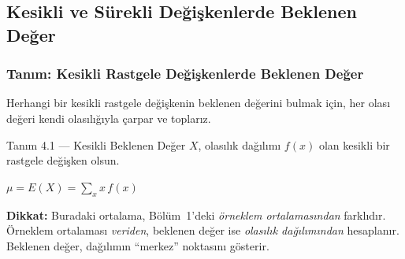 ﻿\documentclass[light]{lutbeamer}
\begin{document}
\subsection{Kesikli ve Sürekli Değişkenlerde Beklenen Değer}

\begin{frame}[fragile]
  \frametitle{Tanım: Kesikli Rastgele Değişkenlerde Beklenen Değer}
  Herhangi bir kesikli rastgele değişkenin beklenen değerini bulmak için, her olası değeri kendi olasılığıyla çarpar ve toplarız.
  \begin{center}
    \begin{minipage}{0.9\textwidth}
      \begin{block}{Tanım 4.1 --- Kesikli Beklenen Değer}
        $X$, olasılık dağılımı $f(x)$ olan kesikli bir rastgele değişken olsun.
        \begin{center}
          $\mu = E(X) = \displaystyle\sum_{x} x\, f(x)$
        \end{center}
      \end{block}
    \end{minipage}
  \end{center}

  \medskip
  {\small \textbf{Dikkat:} Buradaki ortalama, Bölüm~1'deki \emph{örneklem ortalamasından} farklıdır. Örneklem ortalaması \textit{veriden}, beklenen değer ise \textit{olasılık dağılımından} hesaplanır. Beklenen değer, dağılımın ``merkez'' noktasını gösterir.}
\end{frame}
\end{document}
